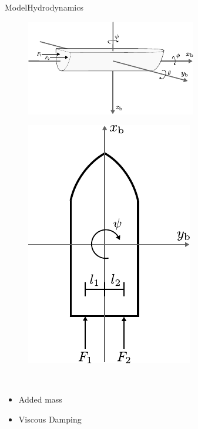 \begin{frame}{Model}{Hydrodynamics}
    \begin{minipage}{0.65\linewidth}
        \begin{figure}[H]
            \centering
            \includegraphics[width=1\linewidth]{figures/boat3DForces}
        \end{figure}        
    \end{minipage}\hfill      
    \begin{minipage}{0.3\linewidth}
        \begin{figure}[H]
            \centering
            \includegraphics[width=0.7\linewidth]{figures/boat2D}
        \end{figure}                
    \end{minipage}\hfill \\
    \begin{itemize}
        \item Added mass
        \item Viscous Damping
    \end{itemize}
\end{frame}

